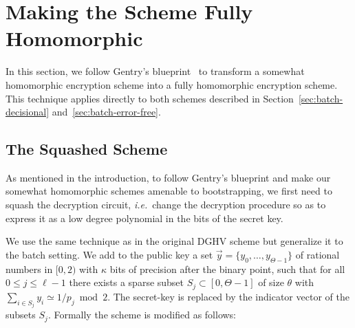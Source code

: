 \documentclass[11pt]{llncs}
\newcommand{\ie}{\textsl{i.e.}\xspace}
\renewcommand\leq\leqslant
\begin{document}

\section{Making the Scheme Fully Homomorphic}

In this section, we follow Gentry's blueprint~\cite{GenPhD} to
transform a somewhat homomorphic encryption scheme into a fully
homomorphic encryption scheme. This technique applies directly to 
both schemes described in Section~\ref{sec:batch-decisional} 
and~\ref{sec:batch-error-free}.

\subsection{The Squashed Scheme}\label{subsec:squashing}

As mentioned in the introduction, to follow Gentry's blueprint and make
our somewhat homomorphic schemes amenable to bootstrapping, we first need
to squash the decryption circuit, \ie~change the decryption procedure
so as to express it as a low degree polynomial in the bits of the secret
key.

We use the same technique as in the original DGHV scheme
\cite{vDGHV2010} but generalize it to 
the batch setting. We add to the public key a set  $\vec y=\{ y_0,
\ldots, y_{\Theta-1} \}$ of rational numbers in $[0, 2)$ with $\kappa$
  bits of precision after the binary point, such that for all  $0 \leq
  j \leq \ell-1$ there exists a sparse subset $S_j \subset
  [0,\Theta-1]$ of size $\theta$ with $\sum_{i\in S_j}y_i\simeq
  1/p_j\bmod 2$.
The secret-key is replaced by the indicator vector of the subsets
$S_j$. Formally the scheme is modified as follows:
\end{document}
